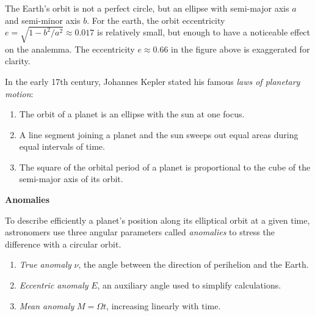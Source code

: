 \documentclass[12pt]{article}
\begin{document}
\begin{figure}
\end{figure}

The Earth's orbit is not a perfect circle, but an ellipse with semi-major axis
$a$ and semi-minor axis $b$. For the earth, the orbit eccentricity 
$e=\sqrt{1-b^2/a^2}\approx 0.017$ is relatively small, but enough to have a
noticeable effect on the analemma. The eccentricity $e\approx 0.66$ in the 
figure above is exaggerated for clarity.

In the early 17th century, Johannes Kepler stated his famous \textit{laws of
planetary motion}:
\begin{enumerate}
    \item The orbit of a planet is an ellipse with the sun at one focus.
    \item A line segment joining a planet and the sun sweeps out equal areas during
        equal intervals of time.
    \item The square of the orbital period of a planet is proportional to the cube
        of the semi-major axis of its orbit.
\end{enumerate}

\textbf{Anomalies}

To describe efficiently a planet's position along its elliptical orbit at a 
given time, astronomers use three angular parameters called \textit{anomalies} to 
stress the difference with a circular orbit. 

\begin{enumerate}
    \item \textit{True anomaly} $\nu$, the angle between the direction of 
    perihelion and the Earth.
    \item \textit{Eccentric anomaly} $E$, an  auxiliary  angle  used to simplify
    calculations.
    \item \textit{Mean anomaly} $M=\Omega t$, increasing linearly with time.
\end{enumerate}
\end{document}
